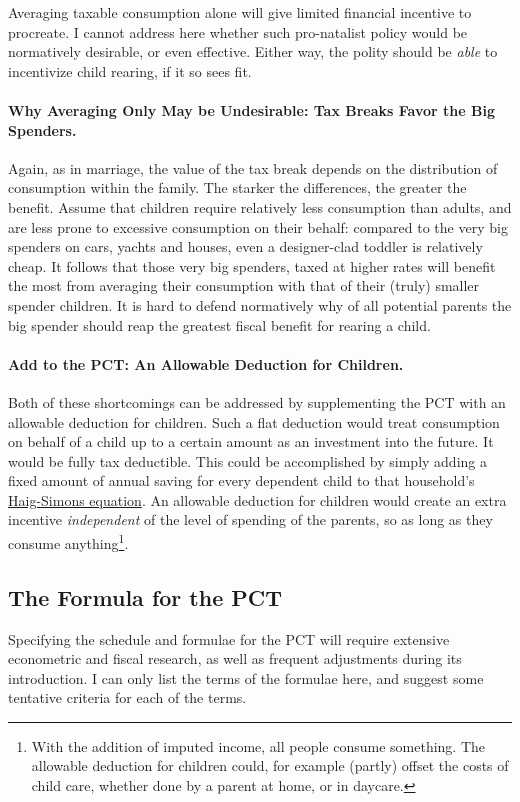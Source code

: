 Averaging taxable consumption alone will give limited financial incentive to procreate. I cannot address here whether such pro-natalist policy would be normatively desirable, or even effective. Either way, the polity should be \emph{able} to incentivize child rearing, if it so sees fit.

\paragraph{Why Averaging Only May be Undesirable: Tax Breaks Favor the Big Spenders.} Again, as in marriage, the value of the tax break depends on the distribution of consumption within the family. The starker the differences, the greater the benefit. Assume that children require relatively less consumption than adults, and are less prone to excessive consumption on their behalf: compared to the very big spenders on cars, yachts and houses, even a designer-clad toddler is relatively cheap. It follows that those very big spenders, taxed at higher rates will benefit the most from averaging their consumption with that of their (truly) smaller spender children. It is hard to defend normatively why of all potential parents the big spender should reap the greatest fiscal benefit for rearing a child.

\paragraph{Add to the PCT: An Allowable Deduction for Children.} Both of these shortcomings can be addressed by supplementing the PCT with an allowable deduction for children.
Such a flat deduction would treat consumption on behalf of a child up to a certain amount as an investment into the future. It would be fully tax deductible. This could be accomplished by simply adding a fixed amount of annual saving for every dependent child to that household's \hyperref[eq:Haig-Simons]{Haig-Simons equation}. An allowable deduction for children would create an extra incentive \emph{independent} of the level of spending of the parents, so as long as they consume anything\footnote{
	With the addition of imputed income, all people consume something. The allowable deduction for children could, for example (partly) offset the costs of child care, whether done by a parent at home, or in daycare.}.

\subsection{The Formula for the PCT} Specifying the schedule and formulae for the PCT will require extensive econometric and fiscal research, as well as frequent adjustments during its introduction. I can only list the terms of the formulae here, and suggest some tentative criteria for each of the terms.

